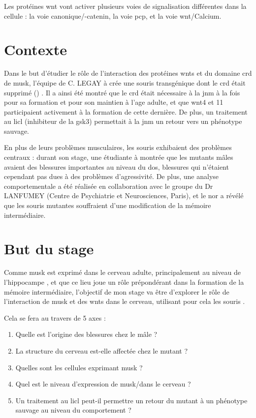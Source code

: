 	Les protéines \gls{wnt} vont activer plusieurs voies de signalisation différentes dans la cellule :  la voie canonique/\textbeta-catenin, la voie \gls{pcp}, et la voie \gls{wnt}/Calcium. 

\section{Contexte}
	\label{sec:Contexte}
	
	Dans le but d'étudier le rôle de l'interaction des protéines \Glspl{wnt} et du domaine \gls{crd} de \gls{musk}, l'équipe de C. LEGAY à crée une souris transgénique dont le \gls{crd} était supprimé (\mcrd) \cite{Messeant2015, Messeant2017}. Il a ainsi été montré que le \gls{crd} était nécessaire à la \gls{jnm} à la fois pour sa formation et pour son maintien à l'age adulte, et que \Gls{wnt}4 et 11 participaient activement à la formation de cette dernière. De plus, un traitement au \gls{licl} (inhibiteur de la \gls{gsk3}) permettait à la \gls{jnm} un retour vers un phénotype sauvage.
	
	En plus de leurs problèmes musculaires, les souris \mcrd exhibaient des problèmes centraux : durant son stage, une étudiante à montrée que les mutants mâles avaient des blessures importantes au niveau du dos, blessures qui n'étaient cependant pas dues à des problèmes d'agressivité. De plus, une analyse comportementale a été réalisée en collaboration avec le groupe du Dr LANFUMEY (Centre de Psychiatrie et Neurosciences, Paris), et le \gls{nor} a révélé que les souris mutantes souffraient d'une modification de la mémoire intermédiaire.
		
\section{But du stage}
\label{sec:IntroBut}

Comme \gls{musk} est exprimé dans le cerveau adulte, principalement au niveau de l'hippocampe \cite{Garcia-Osta2006}, et que ce lieu joue un rôle prépondérant dans la formation de la mémoire intermédiaire, l'objectif de mon stage va être d'explorer le rôle de l'interaction de \gls{musk} et des \Glspl{wnt} dans le cerveau, utilisant pour cela les souris \mcrd.

Cela se fera au travers de 5 axes : 
\begin{enumerate}
	\item Quelle est l'origine des blessures chez le mâle ?
	\item La structure du cerveau est-elle affectée chez le mutant ?
	\item Quelles sont les cellules exprimant \gls{musk} ?
	\item Quel est le niveau d'expression de \gls{musk}/\mcrd dans le cerveau ?
	\item Un traitement au \gls{licl} peut-il permettre un retour du mutant à un phénotype sauvage au niveau du comportement ?
\end{enumerate}